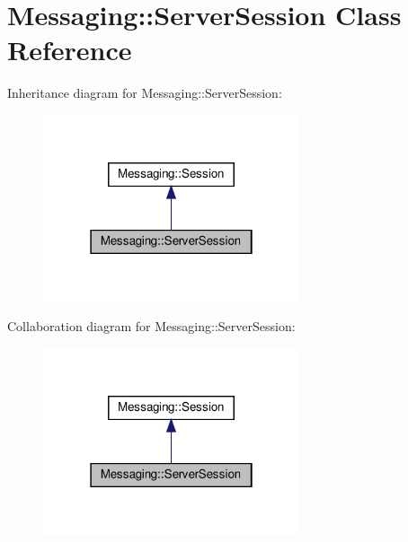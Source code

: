 \hypertarget{class_messaging_1_1_server_session}{}\section{Messaging\+:\+:Server\+Session Class Reference}
\label{class_messaging_1_1_server_session}


Inheritance diagram for Messaging\+:\+:Server\+Session\+:
\nopagebreak
\begin{figure}[H]
\begin{center}
\leavevmode
\includegraphics[width=214pt]{class_messaging_1_1_server_session__inherit__graph}
\end{center}
\end{figure}


Collaboration diagram for Messaging\+:\+:Server\+Session\+:
\nopagebreak
\begin{figure}[H]
\begin{center}
\leavevmode
\includegraphics[width=214pt]{class_messaging_1_1_server_session__coll__graph}
\end{center}
\end{figure}
